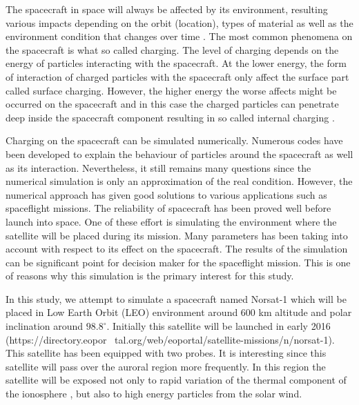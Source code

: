 

The spacecraft in space will always be affected by its environment, resulting various
impacts depending on the orbit (location), types of material as well as the environment
condition that changes over time \citep{trove.nla.gov.au/work/21680840}. The  most common phenomena on the spacecraft is what so
called charging. The level of charging depends on the energy of particles interacting with
the spacecraft. At the lower energy, the form of interaction of charged particles with the
spacecraft only affect the surface part called surface charging. However, the higher energy
the worse affects might be occurred on the spacecraft and in this case the charged particles
can penetrate deep inside the spacecraft component resulting in so called internal charging \citep{fennell2001spacecraft}.

Charging on the spacecraft can be simulated numerically. Numerous codes have been developed
to explain the behaviour of particles around the spacecraft as well as its interaction.
Nevertheless, it still remains many questions since the numerical simulation is only an approximation
of the real condition. However, the numerical approach has given good solutions to various applications
such as spaceflight missions. The reliability of spacecraft has been proved well before launch into space.
One of these effort is simulating the environment where the satellite will be placed during its mission.
Many parameters has been taking into account with respect to its effect on the spacecraft.
The results of the simulation can be significant point for decision maker for the spaceflight
mission. This is one of reasons why this simulation is the primary interest for this study.

In this study, we attempt to simulate a spacecraft named Norsat-1 which will be placed in
Low Earth Orbit (LEO) environment around 600 km altitude and polar inclination around \(98.8^\circ\).
Initially this satellite will be launched in early 2016
(https://directory.eopor~ tal.org/web/eoportal/satellite-missions/n/norsat-1). This satellite
has been equipped with two probes. It is interesting since this satellite will pass over
the auroral region more frequently. In this region  the satellite will be exposed not only to
rapid variation of the thermal component of the ionosphere \citep{hastings1995review}, but also to high
energy particles from the solar wind.

